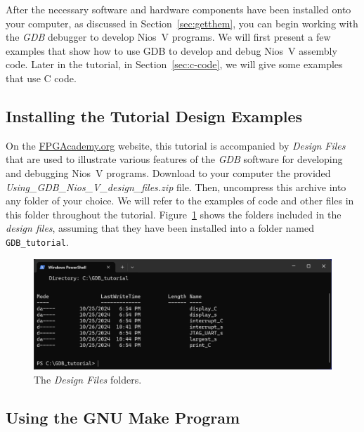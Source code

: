 \documentclass[11pt, twoside, pdftex]{article}
\begin{document}
{After the necessary software and hardware components have been installed onto your computer, 
as discussed in Section~\ref{sec:getthem}, you can begin working with the {\it GDB}
debugger to develop Nios~V programs. We will first present a few examples that show how to 
use GDB to develop and debug Nios~V assembly code. Later in the tutorial, in 
Section~\ref{sec:c-code}, we will give some examples that use C code.

\subsection{Installing the Tutorial Design Examples}
\label{sec:egs}

On the {\href{https://www.fpgacademy.org/courses.html} {FPGAcademy.org}} website, this
tutorial is accompanied by {\it Design Files} that are used to illustrate various features
of the {\it GDB} software for developing and debugging Nios~V programs. Download to your 
computer the provided {\it Using\_GDB\_Nios\_V\_design\_files.zip} file. Then, uncompress 
this archive into any 
folder of your choice. We will refer to the examples of code and other files in this folder 
throughout the tutorial. Figure~\ref{fig:designfiles} shows the folders included in the
{\it design files}, assuming that they have been installed into a folder named
\texttt{GDB\_tutorial}.

\begin{figure}[h]
    \begin{center}
        \includegraphics[width=.9\linewidth]{figures/designfiles.png}
        \caption{The {\it Design Files} folders.}
        \label{fig:designfiles}
    \end{center}
\end{figure}

\subsection{Using the GNU Make Program}

}
\end{document}

